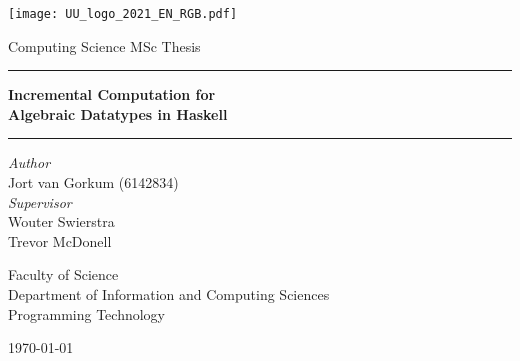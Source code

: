 \begin{titlepage}
  \fontsize{12pt}{15pt}\selectfont
  \begin{center}
    \vspace*{\fill}
    \texttt{[image: UU\_logo\_2021\_EN\_RGB.pdf]}

    \vspace{1.75cm}

    Computing Science MSc Thesis

    \vspace{0.55cm}

    \hrule
    \vspace{0.4cm}
    {
      \fontsize{20.74pt}{20.74pt}\selectfont
      \parbox[]{13cm} {
        \centering
        \textbf{Incremental Computation for \\ Algebraic Datatypes in Haskell}
      }
    }
    \vspace{0.5cm}
    \hrule
      
    \vspace{2.0cm}
    
    \begin{multicols}{2}
      \textit{Author} \\
      Jort van Gorkum (6142834) \\
    \columnbreak
      \textit{Supervisor} \\
      Wouter Swierstra \\
      Trevor McDonell \\
    \end{multicols}

    
    \vspace{2.0cm}

    \begin{small}
      Faculty of Science \\
      Department of Information and Computing Sciences \\
      Programming Technology \\
    \end{small}
    
    \vspace{1.5cm}

    \monthyeardate\today
  \end{center}
\end{titlepage}